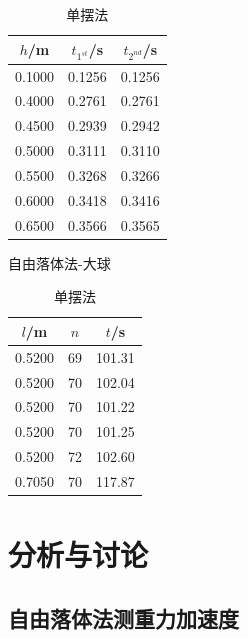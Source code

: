 \documentclass[a4paper]{article}%
\begin{document}
\begin{table}[H]
    \begin{minipage}{0.5\linewidth}  
        \centering
        \begin{tabular}{ccc} 
            \toprule
            $h$/m & $t_{1^{st}}$/s & $t_{2^{nd}}$/s\\
            \midrule
            0.1000 & 0.1256 & 0.1256 \\
            0.4000 & 0.2761	& 0.2761 \\
            0.4500 & 0.2939	& 0.2942 \\
            0.5000 & 0.3111 & 0.3110 \\
            0.5500 & 0.3268	& 0.3266 \\
            0.6000 & 0.3418	& 0.3416 \\
            0.6500 & 0.3566	& 0.3565 \\
            \bottomrule
        \end{tabular}
        \caption{自由落体法-大球}\label{大球}
    \end{minipage}
    \begin{minipage}{0.5\linewidth}  
        \centering
        \begin{tabular}{ccc}
            \toprule
            $l$/m & $n$ & $t$/s\\
            \midrule
            0.5200 & 69 & 101.31 \\
            0.5200 & 70 & 102.04 \\
            0.5200 & 70 & 101.22 \\
            0.5200 & 70 & 101.25 \\
            0.5200 & 72 & 102.60 \\
            0.7050 & 70 & 117.87 \\
            \bottomrule
        \end{tabular}
        \caption{单摆法}\label{单摆}
    \end{minipage}
\end{table}

\section{分析与讨论}
\subsection{自由落体法测重力加速度}
\end{document}
